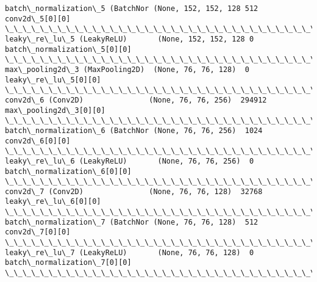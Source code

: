 \documentclass[11pt]{article}
\begin{document}
\begin{Verbatim}[commandchars=\\\{\}]
batch\_normalization\_5 (BatchNor (None, 152, 152, 128 512         conv2d\_5[0][0]                   
\_\_\_\_\_\_\_\_\_\_\_\_\_\_\_\_\_\_\_\_\_\_\_\_\_\_\_\_\_\_\_\_\_\_\_\_\_\_\_\_\_\_\_\_\_\_\_\_\_\_\_\_\_\_\_\_\_\_\_\_\_\_\_\_\_\_\_\_\_\_\_\_\_\_\_\_\_\_\_\_\_\_\_\_\_\_\_\_\_\_\_\_\_\_\_\_\_\_
leaky\_re\_lu\_5 (LeakyReLU)       (None, 152, 152, 128 0           batch\_normalization\_5[0][0]      
\_\_\_\_\_\_\_\_\_\_\_\_\_\_\_\_\_\_\_\_\_\_\_\_\_\_\_\_\_\_\_\_\_\_\_\_\_\_\_\_\_\_\_\_\_\_\_\_\_\_\_\_\_\_\_\_\_\_\_\_\_\_\_\_\_\_\_\_\_\_\_\_\_\_\_\_\_\_\_\_\_\_\_\_\_\_\_\_\_\_\_\_\_\_\_\_\_\_
max\_pooling2d\_3 (MaxPooling2D)  (None, 76, 76, 128)  0           leaky\_re\_lu\_5[0][0]              
\_\_\_\_\_\_\_\_\_\_\_\_\_\_\_\_\_\_\_\_\_\_\_\_\_\_\_\_\_\_\_\_\_\_\_\_\_\_\_\_\_\_\_\_\_\_\_\_\_\_\_\_\_\_\_\_\_\_\_\_\_\_\_\_\_\_\_\_\_\_\_\_\_\_\_\_\_\_\_\_\_\_\_\_\_\_\_\_\_\_\_\_\_\_\_\_\_\_
conv2d\_6 (Conv2D)               (None, 76, 76, 256)  294912      max\_pooling2d\_3[0][0]            
\_\_\_\_\_\_\_\_\_\_\_\_\_\_\_\_\_\_\_\_\_\_\_\_\_\_\_\_\_\_\_\_\_\_\_\_\_\_\_\_\_\_\_\_\_\_\_\_\_\_\_\_\_\_\_\_\_\_\_\_\_\_\_\_\_\_\_\_\_\_\_\_\_\_\_\_\_\_\_\_\_\_\_\_\_\_\_\_\_\_\_\_\_\_\_\_\_\_
batch\_normalization\_6 (BatchNor (None, 76, 76, 256)  1024        conv2d\_6[0][0]                   
\_\_\_\_\_\_\_\_\_\_\_\_\_\_\_\_\_\_\_\_\_\_\_\_\_\_\_\_\_\_\_\_\_\_\_\_\_\_\_\_\_\_\_\_\_\_\_\_\_\_\_\_\_\_\_\_\_\_\_\_\_\_\_\_\_\_\_\_\_\_\_\_\_\_\_\_\_\_\_\_\_\_\_\_\_\_\_\_\_\_\_\_\_\_\_\_\_\_
leaky\_re\_lu\_6 (LeakyReLU)       (None, 76, 76, 256)  0           batch\_normalization\_6[0][0]      
\_\_\_\_\_\_\_\_\_\_\_\_\_\_\_\_\_\_\_\_\_\_\_\_\_\_\_\_\_\_\_\_\_\_\_\_\_\_\_\_\_\_\_\_\_\_\_\_\_\_\_\_\_\_\_\_\_\_\_\_\_\_\_\_\_\_\_\_\_\_\_\_\_\_\_\_\_\_\_\_\_\_\_\_\_\_\_\_\_\_\_\_\_\_\_\_\_\_
conv2d\_7 (Conv2D)               (None, 76, 76, 128)  32768       leaky\_re\_lu\_6[0][0]              
\_\_\_\_\_\_\_\_\_\_\_\_\_\_\_\_\_\_\_\_\_\_\_\_\_\_\_\_\_\_\_\_\_\_\_\_\_\_\_\_\_\_\_\_\_\_\_\_\_\_\_\_\_\_\_\_\_\_\_\_\_\_\_\_\_\_\_\_\_\_\_\_\_\_\_\_\_\_\_\_\_\_\_\_\_\_\_\_\_\_\_\_\_\_\_\_\_\_
batch\_normalization\_7 (BatchNor (None, 76, 76, 128)  512         conv2d\_7[0][0]                   
\_\_\_\_\_\_\_\_\_\_\_\_\_\_\_\_\_\_\_\_\_\_\_\_\_\_\_\_\_\_\_\_\_\_\_\_\_\_\_\_\_\_\_\_\_\_\_\_\_\_\_\_\_\_\_\_\_\_\_\_\_\_\_\_\_\_\_\_\_\_\_\_\_\_\_\_\_\_\_\_\_\_\_\_\_\_\_\_\_\_\_\_\_\_\_\_\_\_
leaky\_re\_lu\_7 (LeakyReLU)       (None, 76, 76, 128)  0           batch\_normalization\_7[0][0]      
\_\_\_\_\_\_\_\_\_\_\_\_\_\_\_\_\_\_\_\_\_\_\_\_\_\_\_\_\_\_\_\_\_\_\_\_\_\_\_\_\_\_\_\_\_\_\_\_\_\_\_\_\_\_\_\_\_\_\_\_\_\_\_\_\_\_\_\_\_\_\_\_\_\_\_\_\_\_\_\_\_\_\_\_\_\_\_\_\_\_\_\_\_\_\_\_\_\_

\end{Verbatim}
\end{document}
